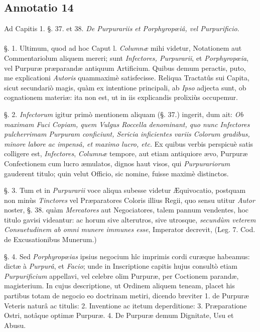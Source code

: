 \documentclass[a4paper, 11pt, oneside, polutonikogreek, german]{article}
\begin{document}
\subsection{Annotatio 14}
\begin{center}
Ad Capitis 1. §. 37. et 38. \emph{De Purpurariis et Porphyropœiâ, vel Purpurificio}.
\end{center}
\paragraph{}
§. 1. Ultimum, quod ad hoc Caput l. \emph{Columnæ} mihi videtur, Notationem aut Commentariolum aliquem mereri; sunt \emph{Infectores, Purpurarii}, et \emph{Porphyropœia}, vel Purpuræ præparandæ antiquum Artificium. Quibus demum peractis, puto, me explicationi \emph{Autoris} quammaximè satisfecisse. Reliqua Tractatûs sui Capita, sicut secundariò magis, quàm ex intentione principali, ab \emph{Ipso} adjecta sunt, ob cognationem materiæ: ita non est, ut in iis explicandis prolixiùs occupemur.

§. 2. \emph{Infectorum} igitur primò mentionem aliquam (§. 37.) ingerit, dum ait: \emph{Ob maximam Fuci Copiam, quem Vulgus Roccella denominant, quo nunc Infectores pulcherrimam Purpuram conficiunt, Sericia inficientes variis Colorum gradibus, minore labore ac impensâ, et maximo lucro, etc.} Ex quibus verbis perspicuè satis colligere est, \emph{Infectores}, \emph{Columnæ} tempore, aut etiam antiquiore ævo, Purpuræ Confectionem cum lucro æmulatos, dignos haut visos, qui \emph{Purpurariorum} gauderent titulo; quin velut Officio, sic nomine, fuisse maximè distinctos.

§. 3. Tum et in \emph{Purpurarii} voce aliqua subesse videtur Æquivocatio, postquam non minùs \emph{Tinctores} vel Præparatores Coloris illius Regii, quo sensu utitur \emph{Autor} noster, §. 38. quàm \emph{Mercatores} aut Negociatores, talem pannum vendentes, hoc titulo gavisi videantur: ac horum sive alterutros, sive utrosque, \emph{secundùm veterem Consuetudinem ab omni munere immunes esse}, Imperator decrevit, (Leg. 7. Cod. de Excusationibus Munerum.)

§. 4. Sed \emph{Porphyropœias} ipsius negocium hîc imprimis cordi curæque habeamus: dictæ à \emph{Purpurâ}, et \emph{Facio}; unde in Inscriptione capitis hujus consultò etiam \emph{Purpurificium} appellavi, vel celebre olim Purpuræ, per Coctionem parandæ, magisterium. In cujus descriptione, ut Ordinem aliquem teneam, placet his partibus totam de negocio eo doctrinam metiri, dicendo breviter 1. de Purpuræ Veteris naturâ ac titulis: 2. Inventione ac itetum deperditione: 3. Præparatione Ostri, notâque optimæ Purpuræ. 4. De Purpuræ demum Dignitate, Usu et Abusu.
\end{document}
